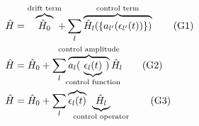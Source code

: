 \documentclass[preview,12pt]{standalone}
\newcommand{\Op}[1]{\ensuremath{\hat{#1}}}
\begin{document}
\begin{align}
  \Op{H} &= \overbrace{\Op{H}_0}^\text{drift term} \hspace{-5pt} + \sum_l \overbrace{\Op{H}_l(\{a_{l'}(\epsilon_{l'}(t))\})}^\text{control term}  \tag{G1} \\
  \Op{H} &= \Op{H}_0 + \sum_l \hspace{-10pt} \overbrace{a_{l}(
            \hspace{-15pt} \underbrace{\epsilon_{l}(t)}_\text{control function} \hspace{-15pt}
           )}^\text{control amplitude} \hspace{-10pt} \Op{H}_l \tag{G2} \\
  \Op{H} &= \Op{H}_0 + \sum_l \overbrace{\epsilon_l(t)}
            \hspace{-15pt} \underbrace{\Op{H}_l}_\text{control operator} \tag{G3}
\end{align}
\end{document}
